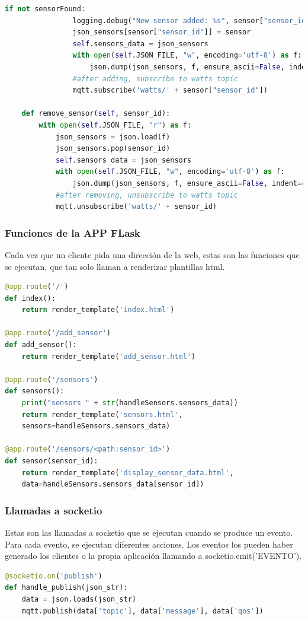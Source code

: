 \begin{titlepage}
\begin{lstlisting}[language=python]
            if not sensorFound:
                logging.debug("New sensor added: %s", sensor["sensor_id"])
                json_sensors[sensor["sensor_id"]] = sensor
                self.sensors_data = json_sensors
                with open(self.JSON_FILE, "w", encoding='utf-8') as f:
                    json.dump(json_sensors, f, ensure_ascii=False, indent=4)
                #after adding, subscribe to watts topic
                mqtt.subscribe('watts/' + sensor["sensor_id"])
    
    def remove_sensor(self, sensor_id):
        with open(self.JSON_FILE, "r") as f:
            json_sensors = json.load(f)
            json_sensors.pop(sensor_id)
            self.sensors_data = json_sensors
            with open(self.JSON_FILE, "w", encoding='utf-8') as f:
                json.dump(json_sensors, f, ensure_ascii=False, indent=4)
            #after removing, unsubscribe to watts topic
            mqtt.unsubscribe('watts/' + sensor_id)
\end{lstlisting}

\subsubsection{Funciones de la APP FLask}
Cada vez que un cliente pida una dirección de la web, estas son las funciones que se ejecutan, que tan solo llaman a renderizar plantillas html.\\
\begin{lstlisting}[language=python]
@app.route('/')
def index():
	return render_template('index.html')

@app.route('/add_sensor')
def add_sensor():
	return render_template('add_sensor.html')

@app.route('/sensors')
def sensors():
	print("sensors " + str(handleSensors.sensors_data))
	return render_template('sensors.html', 
	sensors=handleSensors.sensors_data)

@app.route('/sensors/<path:sensor_id>')
def sensor(sensor_id):
	return render_template('display_sensor_data.html', 
	data=handleSensors.sensors_data[sensor_id])
\end{lstlisting}

\subsubsection{Llamadas a socketio}
Estas son las llamadas a socketio que se ejecutan cuando se produce un evento. Para cada evento, se ejecutan diferentes acciones. Los eventos los pueden haber generado los clientes o la propia aplicación llamando a socketio.emit('EVENTO').\\
\begin{lstlisting}[language=python]
@socketio.on('publish')
def handle_publish(json_str):
	data = json.loads(json_str)
	mqtt.publish(data['topic'], data['message'], data['qos'])



\end{lstlisting}
\end{titlepage}
